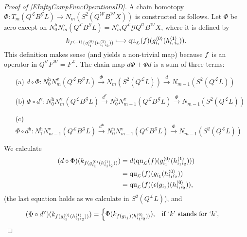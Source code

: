 \documentclass[11pt]{amsart} \renewcommand{\baselinestretch}{1.2}
\theoremstyle{plain}
\theoremstyle{definition}
\renewcommand{\to}{\longrightarrow}
\newcommand{\squishlist}{
  \setlength{\itemsep}{.5pt}
  \setlength{\parskip}{0pt}
  \setlength{\parsep}{0pt}}
\newcommand{\scrG}{\mathscr{G}}
\newcommand{\calU}{\mathcal{U}}
\newcommand{\calL}{\mathcal{L}}
\newcommand{\calw}{\mathcal{W}}
\newcommand{\call}{\mathcal{L}}
\newcommand{\BSW}{{\scrG}}
\newcommand{\BSWres}{B^\BSW}%
\newcommand{\quadratic}{\mathrm{qu}}
\newcommand{\uver}{^\mathrm{v}}
\newcommand{\uhor}{^\mathrm{h}}
\renewcommand{\mapsto}{\longmapsto}
\begin{document}
\begin{Operations in composite functor spectral sequences}
\begin{proof}[Proof of \ref{EInftyCompFuncOperationsID}]
A chain homotopy $\Phi:T_m(Q^{\calL}\BSWres L)\to N_m(S^2(Q^{\calw}B^{\calw}X))$ is constructed as follows. Let $\Phi$ be zero except on 
$N\uhor_0N\uver_m (Q^{\call}\BSWres L)=N\uver_mQ^{\calL}\BSW Q^{\calU}B^{\calw}X$,
where it is defined by
\[\smash{k_{f^{\langle -1\rangle}(g^{\smash{\langle} 0\smash{\rangle}}_{i_1}(h^{\smash{\langle} 1\smash{\rangle}}_{i_1i_2}))}}\mapsto {\quadratic_\call}(f)(g^{\smash{\langle} 0\smash{\rangle}}_{i_1}(h^{\smash{\langle} 1\smash{\rangle}}_{i_1i_2})).\]
This definition makes sense (and yields a non-trivial map) because $f\relax $ is an operator in $Q^{\calU}F^{\calw}=F^{\calL}$.
The chain map $d\Phi+\Phi d$ is a sum of three terms:
\begin{enumerate}\squishlist
\setlength{\parindent}{.25in}
\item[(a)] $d\circ\Phi:N\uhor_0N\uver_m (Q^{\call}\BSWres L)\overset{\Phi}{\to} N_m(S^2(Q^{\call}L))\overset{d}{\to} N_{m-1}(S^2(Q^{\call}L))$ 
\item[(b)] $\Phi\circ d\uver:N\uhor_0N\uver_{m} (Q^{\call}\BSWres L)\overset{d\uver}{\to} N\uhor_0N\uver_{m-1}(Q^{\call}\BSWres L)\overset{\Phi}{\to} N_{m-1}(S^2(Q^{\call}L))$
\item[(c)] $\Phi\circ d\uhor:N\uhor_1N\uver_{m-1}(Q^{\call}\BSWres L)\overset{d\uhor}{\to} N\uhor_0N\uver_{m-1}(Q^{\call}\BSWres L)\overset{\Phi}{\to} N_{m-1}(S^2(Q^{\call}L))$
\end{enumerate}
We calculate
\begin{alignat*}{2}
(d\circ\Phi)(k_{f\relax (g^{\smash{\langle} 0\smash{\rangle}}_{i_1}(h^{\smash{\langle} 1\smash{\rangle}}_{i_1i_2}))})&=d( {\quadratic_\call}(f)(g^{\smash{\langle} 0\smash{\rangle}}_{i_1}(h^{\smash{\langle} 1\smash{\rangle}}_{i_1i_2})))\\
&={\quadratic_\call}(f)(g\relax _{i_1}(h^{\smash{\langle} 0\smash{\rangle}}_{i_1i_2}))\\
&={\quadratic_\call}(f)(\epsilon(g\relax _{i_1})(h^{\smash{\langle} 0\smash{\rangle}}_{i_1i_2})),
\end{alignat*}
(the last equation holds as we calculate in $S^2(Q^{\call}L)$), and 
\begin{alignat*}{2}
(\Phi\circ d\uver)(k_{f\relax (g^{\smash{\langle} 0\smash{\rangle}}_{i_1}(h^{\smash{\langle} 1\smash{\rangle}}_{i_1i_2}))})&=\begin{cases}
\Phi( k_{f\relax (g\relax _{i_1})(h^{\smash{\langle} 0\smash{\rangle}}_{i_1i_2}))}),&\textup{if `$k$' stands for `$h$'},\\

\end{cases}
\end{alignat*}
\end{proof}
\end{Operations in composite functor spectral sequences}
\end{document}
